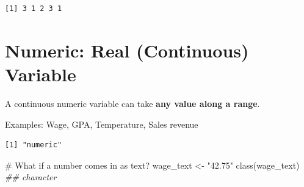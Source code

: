 \documentclass[
  letterpaper,
  DIV=11,
  numbers=noendperiod]{scrreprt}
\newenvironment{Shaded}{\begin{snugshade}}{\end{snugshade}}
\newcommand{\AttributeTok}[1]{\textcolor[rgb]{0.40,0.45,0.13}{#1}}
\newcommand{\CommentTok}[1]{\textcolor[rgb]{0.37,0.37,0.37}{#1}}
\newcommand{\DecValTok}[1]{\textcolor[rgb]{0.68,0.00,0.00}{#1}}
\newcommand{\DocumentationTok}[1]{\textcolor[rgb]{0.37,0.37,0.37}{\textit{#1}}}
\newcommand{\FunctionTok}[1]{\textcolor[rgb]{0.28,0.35,0.67}{#1}}
\newcommand{\NormalTok}[1]{\textcolor[rgb]{0.00,0.23,0.31}{#1}}
\newcommand{\OtherTok}[1]{\textcolor[rgb]{0.00,0.23,0.31}{#1}}
\newcommand{\SpecialCharTok}[1]{\textcolor[rgb]{0.37,0.37,0.37}{#1}}
\newcommand{\StringTok}[1]{\textcolor[rgb]{0.13,0.47,0.30}{#1}}
\begin{document}
\begin{Shaded}
\end{Shaded}

\begin{verbatim}
[1] 3 1 2 3 1
\end{verbatim}

\section{Numeric: Real (Continuous)
Variable}\label{numeric-real-continuous-variable}

A continuous numeric variable can take \textbf{any value along a range}.

Examples: Wage, GPA, Temperature, Sales revenue

\begin{Shaded}
\end{Shaded}

\begin{verbatim}
[1] "numeric"
\end{verbatim}

\begin{Shaded}
\begin{Highlighting}[]
\CommentTok{\# What if a number comes in as text?}
\NormalTok{wage\_text }\OtherTok{\textless{}{-}} \StringTok{"42.75"}
\FunctionTok{class}\NormalTok{(wage\_text)  }\DocumentationTok{\#\# \textquotesingle{}character\textquotesingle{}}
\end{Highlighting}
\end{Shaded}
\end{document}
